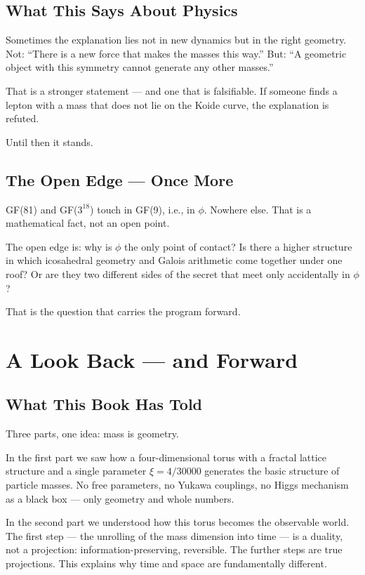 \documentclass[12pt,oneside]{book}
\begin{document}
\section{What This Says About Physics}

Sometimes the explanation lies not in new dynamics but in the right geometry. Not: ``There is a new force that makes the masses this way.'' But: ``A geometric object with this symmetry cannot generate any other masses.''

That is a stronger statement --- and one that is falsifiable. If someone finds a lepton with a mass that does not lie on the Koide curve, the explanation is refuted.

Until then it stands.

\section{The Open Edge --- Once More}

GF(81) and GF($3^{18}$) touch in GF(9), i.e., in $\phi$. Nowhere else. That is a mathematical fact, not an open point.

The open edge is: why is $\phi$ the only point of contact? Is there a higher structure in which icosahedral geometry and Galois arithmetic come together under one roof? Or are they two different sides of the secret that meet only accidentally in $\phi$?

That is the question that carries the program forward.

\chapter{A Look Back --- and Forward}

\section{What This Book Has Told}

Three parts, one idea: mass is geometry.

In the first part we saw how a four-dimen\-sional torus with a fractal lattice structure and a single parameter $\xi = 4/30000$ generates the basic structure of particle masses. No free parameters, no Yukawa couplings, no Higgs mechanism as a black box --- only geometry and whole numbers.

In the second part we understood how this torus becomes the observable world. The first step --- the unrolling of the mass dimension into time --- is a duality, not a projection: information-preserving, reversible. The further steps are true projections. This explains why time and space are fundamentally different.
\end{document}
